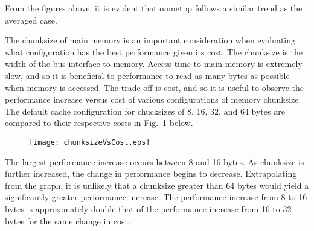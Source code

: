 \documentclass[FinalReport.tex]{subfiles}
\begin{document}
From the figures above, it is evident that onmetpp follows a similar trend as the averaged case.  

 The chunksize of main memory is an important consideration when evaluating what configuration has the best performance given its cost. The chunksize is the width of the bus interface to memory. Access time to main memory is extremely slow, and so it is beneficial to performance to read as many bytes as possible when memory is accessed. The trade-off is cost, and so it is useful to observe the performance increase versus cost of various configurations of memory chunksize. The default cache configuration for chucksizes of 8, 16, 32, and 64 bytes are compared to their respective costs in Fig.~\ref{fig:chunksizes} below.
 
\begin{figure}[H]
\centering
\texttt{[image: chunksizeVsCost.eps]}
\caption{\label{fig:chunksizes}}
\end{figure}

The largest performance increase occurs between 8 and 16 bytes. As chunksize is further increased, the change in performance begins to decrease. Extrapolating from the graph, it is unlikely that a chunksize greater than 64 bytes would yield a significantly greater performance increase. The performance increase from 8 to 16 bytes is approximately double that of the performance increase from 16 to 32 bytes for the same change in cost.
\end{document}
